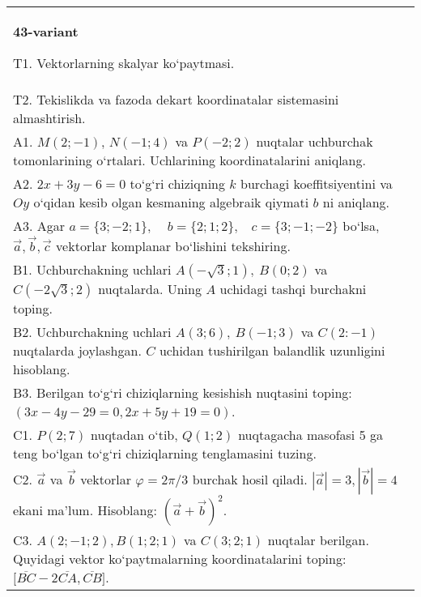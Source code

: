 \documentclass{article}
\begin{document}
\begin{tabular}{m{17cm}}
\textbf{43-variant}

T1. 
Vektorlarning skalyar ko‘paytmasi.
 \\
T2. 
Tekislikda va fazoda dekart koordinatalar sistemasini almashtirish.
 \\
A1. 
$M (2;-1) $, $N (-1;4) $ va $P (-2;2) $ nuqtalar
uchburchak tomonlarining o‘rtalari. Uchlarining koordinatalarini
aniqlang.
 \\
A2. 
$2x+3y-6=0$ to‘g‘ri chiziqning $k$ burchagi
koeffitsiyentini va $Oy$ o‘qidan kesib olgan kesmaning algebraik
qiymati $b$ ni aniqlang.
 \\
A3. 
Agar \(a = \{ 3; - 2;1\},\ \ \ \ \ b = \{ 2;1;2\},\ \ \ \ c = \{ 3; - 1; - 2\}\) bo‘lsa, $\overrightarrow{a}, \overrightarrow{b}, \overrightarrow{c}$ vektorlar komplanar bo‘lishini tekshiring.
 \\
B1. 
Uchburchakning uchlari
\(A\left(-\sqrt{3};1 \right),\ B (0;2) \) va
\(C\left(-2\sqrt{3};2 \right) \) nuqtalarda. Uning $A$
uchidagi tashqi burchakni toping.
 \\
B2. 
Uchburchakning uchlari \(A (3;6),\ B (-1;3) \) va
\(C (2:-1) \) nuqtalarda joylashgan. $C$ uchidan tushirilgan balandlik uzunligini hisoblang.
 \\
B3. 
Berilgan to‘g‘ri chiziqlarning kesishish nuqtasini toping:
$(3x-4y-29=0, 2x+5y+19=0)$.
 \\
C1. 
\(P (2;7) \) nuqtadan o‘tib, \(Q (1;2) \) nuqtagacha
masofasi 5 ga teng bo‘lgan to‘g‘ri chiziqlarning tenglamasini tuzing.
 \\
C2. 
$\vec{a}$ va $\vec{b}$ vektorlar $\varphi = 2\pi/3$ burchak hosil qiladi. $|\vec{a}| = 3,|\vec{b}| = 4$ ekani ma’lum. Hisoblang:
$ (\vec{a} + \vec{b}) ^{2}$.
 \\
C3. 
$A (2; -1;2),B (1;2; 1) $ va $C (3;2;1) $ nuqtalar berilgan. Quyidagi vektor ko‘paytmalarning koordinatalarini toping:
$\lbrack\overline{BC} - 2\overline{CA},\overline{CB}\rbrack$. \\

\end{tabular}
\vspace{1cm}
\end{document}
